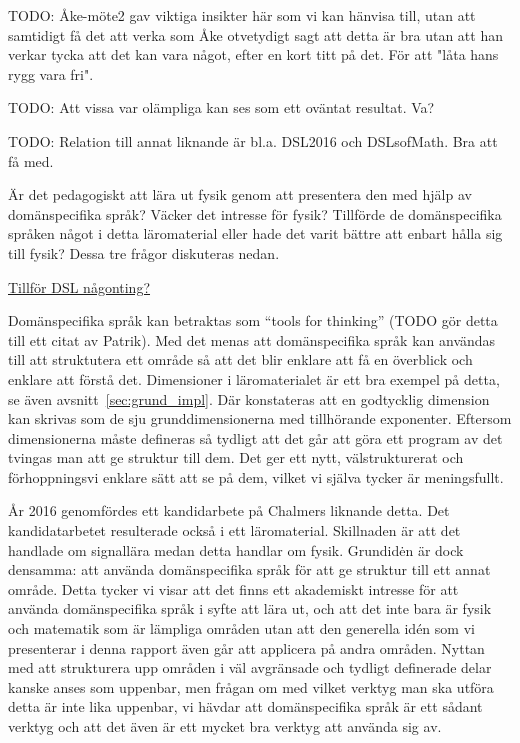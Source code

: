 \begin{draft}
TODO: Åke-möte2 gav viktiga insikter här som vi kan hänvisa till, utan att
samtidigt få det att verka som Åke otvetydigt sagt att detta är bra utan att han
verkar tycka att det kan vara något, efter en kort titt på det. För att "låta
hans rygg vara fri".

TODO: Att vissa var olämpliga kan ses som ett oväntat resultat. Va?

TODO: Relation till annat liknande är bl.a. DSL2016 och DSLsofMath. Bra att få
med.

Är det pedagogiskt att lära ut fysik genom att presentera den med hjälp av
domänspecifika språk? Väcker det intresse för fysik? Tillförde de domänspecifika
språken något i detta läromaterial eller hade det varit bättre att enbart hålla
sig till fysik? Dessa tre frågor diskuteras nedan.

{\Large \underline{Tillför DSL någonting?}}

Domänspecifika språk kan betraktas som ``tools for thinking'' (TODO gör detta
till ett citat av Patrik). Med det menas att domänspecifika språk kan användas
till att struktutera ett område så att det blir enklare att få en överblick och
enklare att förstå det. Dimensioner i läromaterialet är ett bra exempel på
detta, se även avsnitt~\ref{sec:grund_impl}. Där konstateras att en godtycklig
dimension kan skrivas som de sju grunddimensionerna med tillhörande exponenter.
Eftersom dimensionerna måste defineras så tydligt att det går att göra ett
program av det tvingas man att ge struktur till dem. Det ger ett nytt,
välstrukturerat och förhoppningsvi enklare sätt att se på dem, vilket vi själva
tycker är meningsfullt.

År 2016 genomfördes ett kandidarbete på Chalmers liknande detta. \cite{DSL2016}
Det kandidatarbetet resulterade också i ett läromaterial. Skillnaden är att det
handlade om signallära medan detta handlar om fysik. Grundidėn är dock densamma:
att använda domänspecifika språk för att ge struktur till ett annat område.
Detta tycker vi visar att det finns ett akademiskt intresse för att använda
domänspecifika språk i syfte att lära ut, och att det inte bara är fysik och
matematik som är lämpliga områden utan att den generella idén som vi presenterar
i denna rapport även går att applicera på andra områden. Nyttan med att
strukturera upp områden i väl avgränsade och tydligt definerade delar kanske
anses som uppenbar, men frågan om med vilket verktyg man ska utföra detta är
inte lika uppenbar, vi hävdar att domänspecifika språk är ett sådant verktyg och
att det även är ett mycket bra verktyg att använda sig av.


\end{draft}
